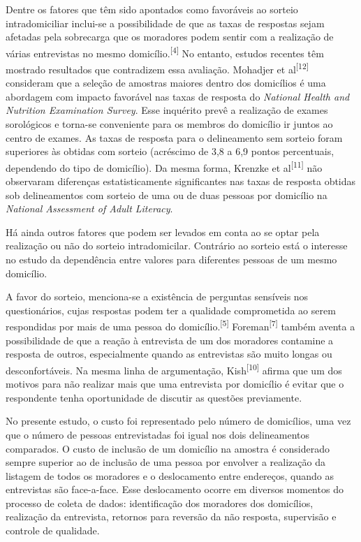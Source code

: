 \documentclass{article}
\begin{document}
Dentre os fatores que têm sido apontados como favoráveis ao sorteio
intradomiciliar inclui-se a possibilidade de que as taxas de respostas sejam
afetadas pela sobrecarga que os moradores podem sentir com a realização de
várias entrevistas no mesmo domicílio.\textsuperscript{[}\textsuperscript{4}\textsuperscript{]}
No entanto, estudos recentes têm mostrado resultados que contradizem essa
avaliação. Mohadjer et al\textsuperscript{[}\textsuperscript{12}\textsuperscript{]}
consideram que a seleção de amostras maiores dentro dos domicílios é uma
abordagem com impacto favorável nas taxas de resposta do \textit{National Health
and Nutrition Examination Survey}. Esse inquérito prevê a realização de exames sorológicos e torna-se conveniente
para os membros do domicílio ir juntos ao centro de exames. As taxas de resposta
para o delineamento sem sorteio foram superiores às obtidas com sorteio
(acréscimo de 3,8 a 6,9 pontos percentuais, dependendo do tipo de domicílio). Da
mesma forma, Krenzke et al\textsuperscript{[}\textsuperscript{11}\textsuperscript{]}
não observaram diferenças estatisticamente significantes nas taxas de resposta
obtidas sob delineamentos com sorteio de uma ou de duas pessoas por domicílio na
\textit{National Assessment of Adult Literacy}.

Há ainda outros fatores que podem ser levados em conta ao se optar pela
realização ou não do sorteio intradomicilar. Contrário ao sorteio está o
interesse no estudo da dependência entre valores para diferentes pessoas de um
mesmo domicílio.

A favor do sorteio, menciona-se a existência de perguntas sensíveis nos
questionários, cujas respostas podem ter a qualidade comprometida ao serem
respondidas por mais de uma pessoa do
domicílio.\textsuperscript{[}\textsuperscript{5}\textsuperscript{]}
Foreman\textsuperscript{[}\textsuperscript{7}\textsuperscript{]}
também aventa a possibilidade de que a reação à entrevista de um dos moradores
contamine a resposta de outros, especialmente quando as entrevistas são muito
longas ou desconfortáveis. Na mesma linha de argumentação,
Kish\textsuperscript{[}\textsuperscript{10}\textsuperscript{]}
afirma que um dos motivos para não realizar mais que uma entrevista por
domicílio é evitar que o respondente tenha oportunidade de discutir as questões
previamente.

No presente estudo, o custo foi representado pelo número de domicílios, uma vez
que o número de pessoas entrevistadas foi igual nos dois delineamentos
comparados. O custo de inclusão de um domicílio na amostra é considerado sempre
superior ao de inclusão de uma pessoa por envolver a realização da listagem de
todos os moradores e o deslocamento entre endereços, quando as entrevistas são
face-a-face. Esse deslocamento ocorre em diversos momentos do processo de coleta
de dados: identificação dos moradores dos domicílios, realização da entrevista,
retornos para reversão da não resposta, supervisão e controle de qualidade.
\end{document}
